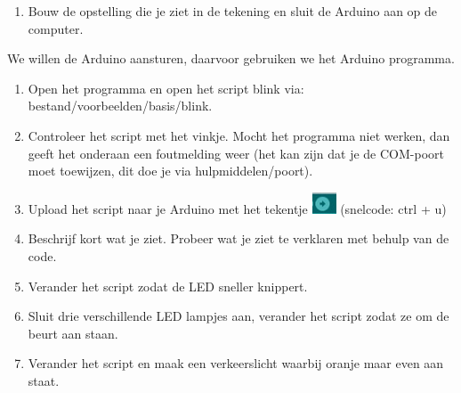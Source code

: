 \documentclass{arduino}
\begin{document}
\begin{enumerate}[label={\alph*})]
\item Bouw de opstelling die je ziet in de tekening en sluit de Arduino aan op de computer.
\end{enumerate}

We willen de Arduino aansturen, daarvoor gebruiken we het Arduino programma.

\begin{enumerate}[label={\alph*})]
\item Open het programma en open het script blink via: bestand/voorbeelden/basis/blink.

\item Controleer het script met het vinkje. Mocht het programma niet werken, dan geeft het onderaan een foutmelding weer (het kan zijn dat je de COM-poort moet toewijzen, dit doe je via hulpmiddelen/poort).

\item Upload het script naar je Arduino met het tekentje \includegraphics{10. Arduino upload} (snelcode: ctrl + u)

\item Beschrijf kort wat je ziet. Probeer wat je ziet te verklaren met behulp van de code.

\item Verander het script zodat de LED sneller knippert.

\item Sluit drie verschillende LED lampjes aan, verander het script zodat ze om de beurt aan staan.

\item Verander het script en maak een verkeerslicht waarbij oranje maar even aan staat.
\end{enumerate}

\newpage
\end{document}
